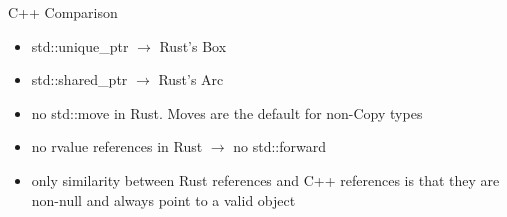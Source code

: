 
\begin{frame}{C++ Comparison}
	\begin{itemize}
    \item std::unique\_ptr $\rightarrow$ Rust's Box
    \item std::shared\_ptr $\rightarrow$ Rust's Arc
    \item no std::move in Rust. Moves are the default for non-Copy types
    \item no rvalue references in Rust $\rightarrow$ no std::forward
    \item only similarity between Rust references and C++ references is that they are non-null and always point to a valid object
	\end{itemize}
\end{frame}